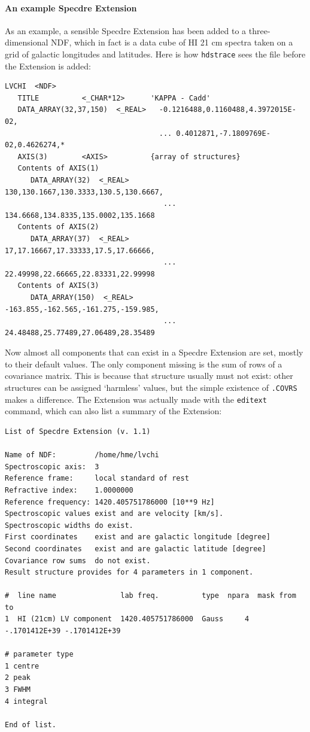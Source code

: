 \documentclass[11pt,twoside]{article}
\newcommand{\xref}[3]{#1}
\begin{document}

\paragraph{An example Specdre Extension}

   As an example, a sensible Specdre Extension has been added to a
   three-dimensional NDF, which in fact is a data cube of HI 21 cm
   spectra taken on a grid of galactic longitudes and latitudes. Here is
   how
{\tt\xref{hdstrace}{sun102}{}}
   sees the file before the Extension is added:

\small
\begin{verbatim}
LVCHI  <NDF>
   TITLE          <_CHAR*12>      'KAPPA - Cadd'
   DATA_ARRAY(32,37,150)  <_REAL>   -0.1216488,0.1160488,4.3972015E-02,
                                    ... 0.4012871,-7.1809769E-02,0.4626274,*
   AXIS(3)        <AXIS>          {array of structures}
   Contents of AXIS(1)
      DATA_ARRAY(32)  <_REAL>        130,130.1667,130.3333,130.5,130.6667,
                                     ... 134.6668,134.8335,135.0002,135.1668
   Contents of AXIS(2)
      DATA_ARRAY(37)  <_REAL>        17,17.16667,17.33333,17.5,17.66666,
                                     ... 22.49998,22.66665,22.83331,22.99998
   Contents of AXIS(3)
      DATA_ARRAY(150)  <_REAL>       -163.855,-162.565,-161.275,-159.985,
                                     ... 24.48488,25.77489,27.06489,28.35489
\end{verbatim}
\normalsize

   Now almost all components that can exist in a Specdre Extension are
   set, mostly to their default values. The only component missing is
   the sum of rows of a covariance matrix. This is because that
   structure usually must not exist: other structures can be assigned
   `harmless' values, but the simple existence of {\tt .COVRS} makes a
   difference. The Extension was actually made with the {\tt editext}
   command, which can also list a summary of the Extension:

\small
\begin{verbatim}
List of Specdre Extension (v. 1.1)

Name of NDF:         /home/hme/lvchi
Spectroscopic axis:  3
Reference frame:     local standard of rest
Refractive index:    1.0000000
Reference frequency: 1420.405751786000 [10**9 Hz]
Spectroscopic values exist and are velocity [km/s].
Spectroscopic widths do exist.
First coordinates    exist and are galactic longitude [degree]
Second coordinates   exist and are galactic latitude [degree]
Covariance row sums  do not exist.
Result structure provides for 4 parameters in 1 component.

#  line name               lab freq.          type  npara  mask from     to
1  HI (21cm) LV component  1420.405751786000  Gauss     4  -.1701412E+39 -.1701412E+39

# parameter type
1 centre
2 peak
3 FWHM
4 integral

End of list.
\end{verbatim}
\normalsize
\end{document}
